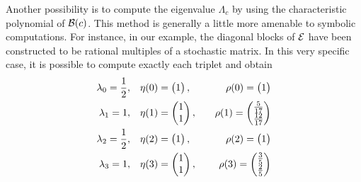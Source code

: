 \documentclass{article}
\begin{document}
Another possibility is to compute the eigenvalue $\Lambda _c$ by using the characteristic polynomial
of $\mathcal B(c)$. This method is generally a little more amenable to symbolic computations.
For instance, in our example, the diagonal blocks of $\mathcal{E}$ have been 
constructed to be rational multiples of a stochastic matrix. In this very specific case, it is possible to compute exactly
each triplet and obtain
%
\begin{equation} \begin{aligned}
 \lambda_{0} = \frac{1}{2},  \quad& \eta(0) = \begin{pmatrix}
1
\end{pmatrix}, \quad& \rho(0) = \begin{pmatrix}
1
\end{pmatrix} \\  \lambda_{1} = 1,  \quad& \eta(1) = \begin{pmatrix}
1\\
1
\end{pmatrix}, \quad& \rho(1) = \begin{pmatrix}
\frac{5}{17}\\
\frac{12}{17}
\end{pmatrix} \\  \lambda_{2} = \frac{1}{2},  \quad& \eta(2) = \begin{pmatrix}
1
\end{pmatrix}, \quad& \rho(2) = \begin{pmatrix}
1
\end{pmatrix} \\  \lambda_{3} = 1,  \quad& \eta(3) = \begin{pmatrix}
1\\
1
\end{pmatrix}, \quad& \rho(3) = \begin{pmatrix}
\frac{3}{5}\\
\frac{2}{5}
\end{pmatrix} \\ 
\end{aligned}\end{equation} 
\end{document}
